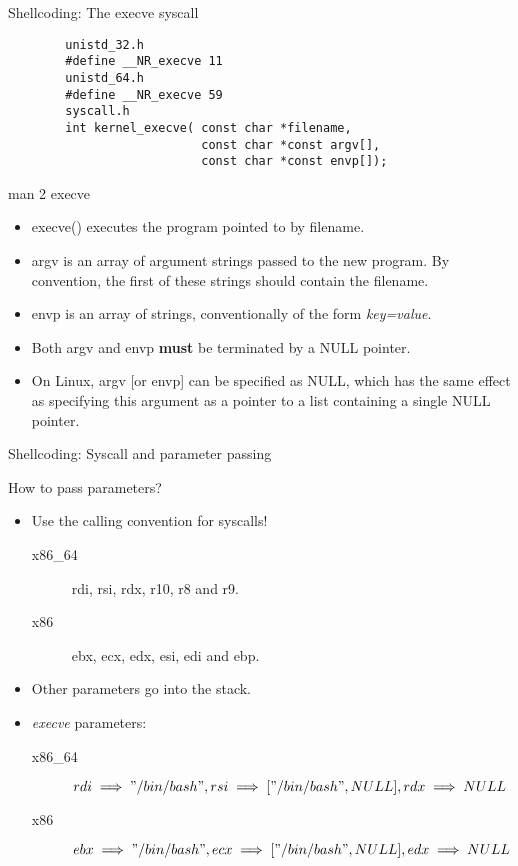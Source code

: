 \begin{frame}{Shellcoding: The execve syscall}
	\ccode
	\begin{lstlisting}
		unistd_32.h
		#define __NR_execve 11
		unistd_64.h
		#define __NR_execve 59
		syscall.h
		int kernel_execve( const char *filename,
		                   const char *const argv[],
		                   const char *const envp[]);
	\end{lstlisting}
	\begin{block}{man 2 execve}
		\begin{itemize}
			\item execve() executes  the  program  pointed to by filename.
			\item argv is an array of argument strings passed to the new program. By
				convention, the first of these  strings  should contain the filename.
			\item envp is an array of strings, conventionally of the form \emph{key=value}.
			\item Both argv and envp \textbf{must} be terminated by a NULL pointer.
			\item On Linux, argv [or envp] can be specified as NULL, which has the same effect as specifying  this  argument as a pointer to a list containing a single NULL pointer.
		\end{itemize}
	\end{block}
\end{frame}

\begin{frame}{Shellcoding: Syscall and parameter passing}
	\begin{block}{How to pass parameters?}
		\begin{itemize}
			\item Use the calling convention for syscalls!
				\begin{description}
					\item[x86\_64]rdi, rsi, rdx, r10, r8 and r9.
					\item[x86]ebx, ecx, edx, esi, edi and ebp.
				\end{description}
			\item Other parameters go into the stack.
			\item \emph{execve} parameters:
				\begin{description}
					\item[x86\_64]$rdi \implies "/bin/bash", rsi \implies ["/bin/bash",
						NULL], rdx \implies NULL$
					\item[x86]$ebx \implies "/bin/bash", ecx \implies ["/bin/bash", NULL], edx \implies NULL$
				\end{description}
		\end{itemize}
	\end{block}
\end{frame}


